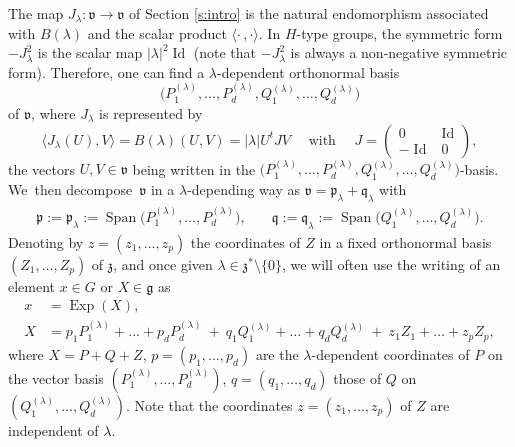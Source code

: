 \documentclass[JEP,XML,SOM,Unicode,published]{cedram}
\DeclareMathOperator{\Exp}{Exp}
\DeclareMathOperator{\Id}{Id}
\DeclareMathOperator{\Span}{Span}
\theoremstyle{plain}
\theoremstyle{definition}
\begin{document}
The map $J_\lambda:\mathfrak v\to \mathfrak v$ of Section \ref{s:intro} is the natural endomorphism associated with $B(\lambda)$ and the scalar product $\langle \cdot\,,\cdot\rangle$.
In $H$-type groups,
the symmetric form $-J_\lambda^2$ is the scalar map $|\lambda|^2 \Id$ (note that $-J_\lambda^2$ is always a non-negative symmetric form).
Therefore, one can find a $\lambda$-dependent orthonormal basis
\[
\bigl (P_1^{(\lambda)}, \dots,P_d^{(\lambda)}, Q_1^{(\lambda)}, \dots,Q_d^{(\lambda)} \bigr)
\]
of $\mathfrak v$, where $J_\lambda$ is represented by
\[
\langle J_\lambda(U),V\rangle=B(\lambda)(U,V)= |\lambda| U^t JV\quad \mbox{ with }\quad
J=\begin{pmatrix}0 & \Id \\ -\Id & 0\end{pmatrix},
\]
the vectors $U,V\in \mathfrak v$ being written in the $\bigl (P_1^{(\lambda)}, \dots,P_d^{(\lambda)}, Q_1^{(\lambda)}, \dots,Q_d^{(\lambda)} \bigr)$-basis.
We~then decompose~$ \mathfrak v$ in a $\lambda$-depending way as
$ \mathfrak v = \mathfrak p_\lambda+ \mathfrak q_\lambda$
with
\[
\begin{aligned}
\mathfrak p:=\mathfrak p_\lambda:= \Span \big (P_1^{(\lambda)}, \dots,P_d^{(\lambda)} \big), & \quad \mathfrak q:=\mathfrak q_\lambda:= \Span \big (Q_1^{(\lambda)}, \dots,Q_d^{(\lambda)}\big).
\end{aligned}
\]
Denoting by $z=(z_1,\dots,z_p)$ the coordinates of $Z$ in a fixed orthonormal basis $(Z_1,\dots, Z_p)$ of $\mathfrak z$, and once given $\lambda\in\mathfrak z^*\setminus\{0\}$,
we will often use the writing of an element $x\in G$ or $X\in \mathfrak g$ as
\begin{equation}
\label{eqxpqz}
\begin{split}
x&=\Exp(X),\\
X&=p_1P_1^{(\lambda)} +\ldots + p_dP_d^{(\lambda)} \ + \ q_1Q_1^{(\lambda)} + \ldots + q_d Q_d ^{(\lambda)}\ + \ z_1 Z_1 +\ldots + z_p Z_p,
\end{split}
\end{equation}
where $X=P+Q+Z$, $p=(p_1,\dots,p_d)$ are the $\lambda$-dependent coordinates of $P$ on the vector basis $(P_1^{(\lambda)},\dots,P_d^{(\lambda)})$, $q=(q_1,\dots,q_d)$ those of $Q$ on $(Q_1^{(\lambda)},\dots,Q_d^{(\lambda)})$. Note that the coordinates $z=(z_1,\dots, z_p)$ of $Z$ are independent of $\lambda$.
\end{document}
